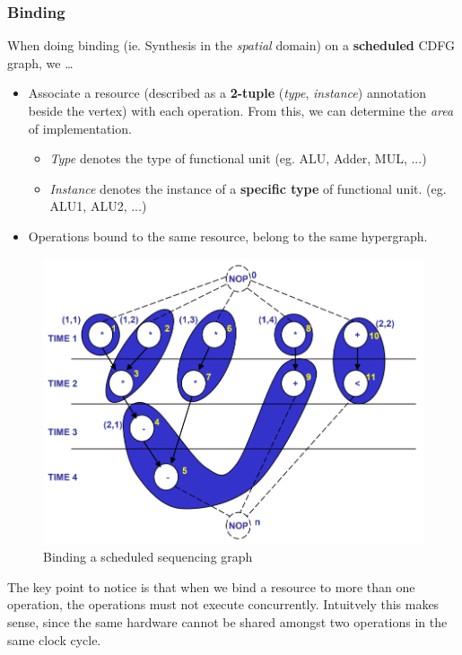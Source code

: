 \documentclass{article}
\begin{document}
\newpage
\subsubsection{Binding}
When doing binding (ie. Synthesis in the \textit{spatial} domain) on a \textbf{scheduled} CDFG graph, we \dots
\begin{itemize}
    \item Associate a resource (described as a \textbf{2-tuple} (\textit{type}, \textit{instance}) annotation beside the vertex) with each operation.
        From this, we can determine the \textit{area} of implementation.
        \begin{itemize}
            \item \textit{Type} denotes the type of functional unit (eg. ALU, Adder, MUL, ...)
            \item \textit{Instance} denotes the instance of a \textbf{specific type} of functional unit. (eg. ALU1, ALU2, ...)
        \end{itemize}
    \item Operations bound to the same resource, belong to the same hypergraph.
\end{itemize}

\begin{figure}[htp]
    \centering
    \includegraphics[width=12cm, scale=1]{S2/bindingGraphExample.PNG}
    \caption{Binding a scheduled sequencing graph}
\end{figure}

The key point to notice is that when we bind a resource to more than one operation, the operations must not execute concurrently.
Intuitvely this makes sense, since the same hardware cannot be shared amongst two operations in the same clock cycle.
\end{document}
